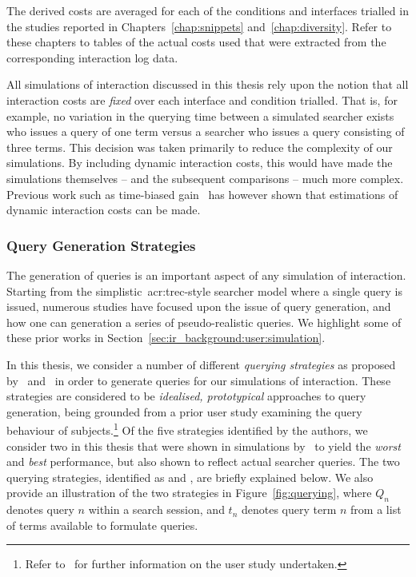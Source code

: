 The derived costs are averaged for each of the conditions and interfaces trialled in the studies reported in Chapters~\ref{chap:snippets} and~\ref{chap:diversity}. Refer to these chapters to tables of the actual costs used that were extracted from the corresponding interaction log data.

All simulations of interaction discussed in this thesis rely upon the notion that all interaction costs are \emph{fixed} over each interface and condition trialled. That is, for example, no variation in the querying time between a simulated searcher exists who issues a query of one term versus a searcher who issues a query consisting of three terms. This decision was taken primarily to reduce the complexity of our simulations. By including dynamic interaction costs, this would have made the simulations themselves -- and the subsequent comparisons -- much more complex. Previous work such as time-biased gain~\citep{smucker2012tbg} has however shown that estimations of dynamic interaction costs can be made.

\subsubsection{Query Generation Strategies}\label{sec:method:simulation:grounding:querying}
The generation of queries is an important aspect of any simulation of interaction. Starting from the simplistic~\gls{acr:trec}-style searcher model where a single query is issued, numerous studies have focused upon the issue of query generation, and how one can generation a series of pseudo-realistic queries. We highlight some of these prior works in Section~\ref{sec:ir_background:user:simulation}.

In this thesis, we consider a number of different \emph{querying strategies} as proposed by~\cite{keskustalo2009querying} and~\cite{baskaya2013behavioural_factors} in order to generate queries for our simulations of interaction. These strategies are considered to be \emph{idealised, prototypical} approaches to query generation, being grounded from a prior user study examining the query behaviour of subjects.\footnote{Refer to~\cite{keskustalo2009querying} for further information on the user study undertaken.} Of the five strategies identified by the authors, we consider two in this thesis that were shown in simulations by~\cite{keskustalo2009querying} to yield the \emph{worst} and \emph{best} performance, but also shown to reflect actual searcher queries. The two querying strategies, identified as  and , are briefly explained below. We also provide an illustration of the two strategies in Figure~\ref{fig:querying}, where $Q_n$ denotes query $n$ within a search session, and $t_n$ denotes query term $n$ from a list of terms available to formulate queries.

